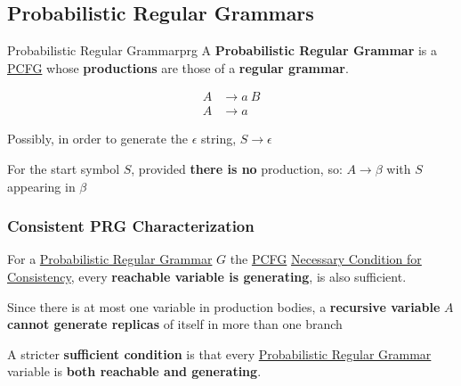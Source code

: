\subsection{Probabilistic Regular Grammars}\label{sub:lm_probabilistic_regular_grammars} %
\begin{definition}{Probabilistic Regular Grammar}{prg}
    A \textbf{Probabilistic Regular Grammar} is a \hyperref[def:pcfg]{PCFG} whose \textbf{productions} are those of a \textbf{regular grammar}.
\end{definition}
\begin{example}{}{}
    \[
        \begin{aligned}
            A&\to a\ B \\
            A&\to a
        \end{aligned}
    \]
    \begin{note}
        Possibly, in order to generate the $\epsilon$ string, $S\to\epsilon$
        \begin{warning}
            For the start symbol $S$, provided \textbf{there is no} production, so: $A\to\beta$ with $S$ appearing in $\beta$
        \end{warning}
    \end{note}
\end{example}
%
\subsubsection{Consistent PRG Characterization}\label{sub:lm_consistent_prg_characterization} %
For a \hyperref[def:prg]{Probabilistic Regular Grammar} $G$ the \hyperref[def:pcfg]{PCFG} \hyperref[sub:lm_necessary_condition_for_consistency]{Necessary Condition for Consistency}, every \textbf{reachable variable is generating}, is also sufficient.
\begin{tip}
    Since there is at most one variable in production bodies, a \textbf{recursive variable} $A$ \textbf{cannot generate replicas} of itself in more than one branch
\end{tip}
A stricter \textbf{sufficient condition} is that every \hyperref[def:prg]{Probabilistic Regular Grammar} variable is \textbf{both reachable and generating}.
%
